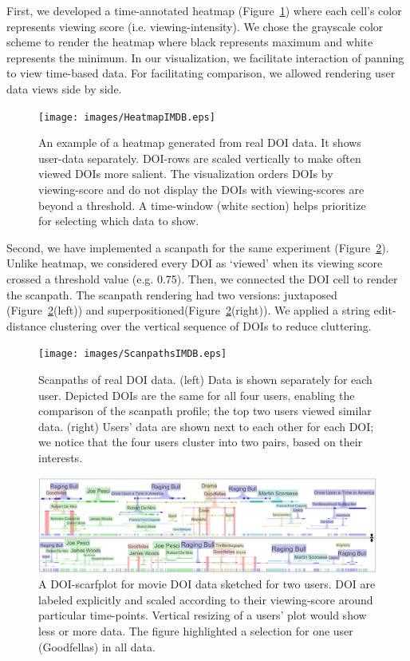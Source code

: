 First, we developed a time-annotated heatmap (Figure~\ref{fig:HeatmapIMDB}) where each cell's color represents viewing score (i.e. viewing-intensity). We chose the grayscale color scheme to render the heatmap where black represents maximum and white represents the minimum. In our visualization, we facilitate interaction of panning to view time-based data. For facilitating comparison, we allowed rendering user data views side by side. 
\begin{figure}[htb]
  \centering
	\texttt{[image: images/HeatmapIMDB.eps]}
  \caption{An example of a heatmap generated from real DOI data. It shows user-data separately. DOI-rows are scaled vertically to make often viewed DOIs more salient. The visualization orders DOIs by viewing-score and do not display the DOIs with viewing-scores are beyond a threshold. A time-window (white section) helps prioritize for selecting which data to show.}
	\label{fig:HeatmapIMDB}
\end{figure}

Second, we have implemented a scanpath for the same experiment (Figure~\ref{fig:ScanpathsIMDB}). Unlike heatmap, we considered every DOI as `viewed' when its viewing score crossed a threshold value (e.g. 0.75). Then, we connected the DOI cell to render the scanpath. The scanpath rendering had two versions: juxtaposed (Figure~\ref{fig:ScanpathsIMDB}(left)) and superpositioned(Figure~\ref{fig:ScanpathsIMDB}(right)). We applied a string edit-distance clustering over the vertical sequence of DOIs to reduce cluttering. 
\begin{figure}[!htb]
  \centering
  \texttt{[image: images/ScanpathsIMDB.eps]}
  \caption{Scanpaths of real DOI data. (left) Data is shown separately for each user. Depicted DOIs are the same for all four users, enabling the comparison of the scanpath profile; the top two users viewed similar data. (right) Users' data are shown next to each other for each DOI; we notice that the four users cluster into two pairs, based on their interests.}
	\label{fig:ScanpathsIMDB}
\end{figure}

\begin{figure}
  \centering
  \includegraphics[width=\linewidth]{images/ScarfsIMDB.eps}
  \caption{A DOI-scarfplot for movie DOI data sketched for two users. DOI are labeled explicitly and scaled according to their viewing-score around particular time-points. Vertical resizing of a users' plot would show less or more data. The figure highlighted a selection for one user (Goodfellas) in all data. }
	\label{fig:ScarfsIMDB}
\end{figure}

